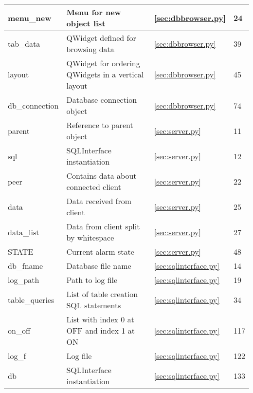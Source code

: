 \documentclass[12pt,a4paper]{report}
\begin{document}
\begin{table}[H]
\begin{tabular}{|l|m{6cm}|l|l|}
    menu\_new     & Menu for new object list                           & \ref{sec:dbbrowser.py} & 24          \\ \hline
    tab\_data     & QWidget defined for browsing data                  & \ref{sec:dbbrowser.py} & 39          \\ \hline
    layout        & QWidget for ordering QWidgets in a vertical layout & \ref{sec:dbbrowser.py} & 45          \\ \hline
    db\_connection & Database connection object                         & \ref{sec:dbbrowser.py} & 74          \\ \hline
    parent        & Reference to parent object                         & \ref{sec:server.py} & 11          \\ \hline
    sql           & SQLInterface instantiation                         & \ref{sec:server.py} & 12          \\ \hline
    peer          & Contains data about connected client               & \ref{sec:server.py} & 22          \\ \hline
    data          & Data received from client                          & \ref{sec:server.py} & 25          \\ \hline
    data\_list    & Data from client split by whitespace               & \ref{sec:server.py} & 27          \\ \hline
    STATE         & Current alarm state                                & \ref{sec:server.py} & 48          \\ \hline
    db\_fname     & Database file name                                 & \ref{sec:sqlinterface.py} & 14          \\ \hline
    log\_path     & Path to log file                                   & \ref{sec:sqlinterface.py} & 19          \\ \hline
    table\_queries & List of table creation SQL statements              & \ref{sec:sqlinterface.py} & 34          \\ \hline
    on\_off       & List with index 0 at OFF and index 1 at ON         & \ref{sec:sqlinterface.py} & 117         \\ \hline
    log\_f        & Log file                                           & \ref{sec:sqlinterface.py} & 122         \\ \hline
    db            & SQLInterface instantiation                         & \ref{sec:sqlinterface.py} & 133         \\ \hline
    \end{tabular}
\end{table}
\end{document}
